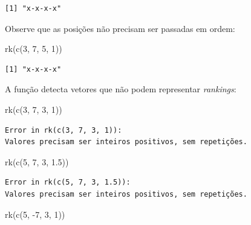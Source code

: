 \documentclass[
  letterpaper,
  DIV=11,
  numbers=noendperiod]{scrreprt}
\newenvironment{Shaded}{\begin{snugshade}}{\end{snugshade}}
\newcommand{\DecValTok}[1]{\textcolor[rgb]{0.68,0.00,0.00}{#1}}
\newcommand{\FloatTok}[1]{\textcolor[rgb]{0.68,0.00,0.00}{#1}}
\newcommand{\FunctionTok}[1]{\textcolor[rgb]{0.28,0.35,0.67}{#1}}
\newcommand{\NormalTok}[1]{\textcolor[rgb]{0.00,0.23,0.31}{#1}}
\newcommand{\SpecialCharTok}[1]{\textcolor[rgb]{0.37,0.37,0.37}{#1}}
\begin{document}
\begin{verbatim}
[1] "x-x-x-x"
\end{verbatim}

Observe que as posições não precisam ser passadas em ordem:

\begin{Shaded}
\begin{Highlighting}[]
\FunctionTok{rk}\NormalTok{(}\FunctionTok{c}\NormalTok{(}\DecValTok{3}\NormalTok{, }\DecValTok{7}\NormalTok{, }\DecValTok{5}\NormalTok{, }\DecValTok{1}\NormalTok{))}
\end{Highlighting}
\end{Shaded}

\begin{verbatim}
[1] "x-x-x-x"
\end{verbatim}

A função detecta vetores que não podem representar \emph{rankings}:

\begin{Shaded}
\begin{Highlighting}[]
\FunctionTok{rk}\NormalTok{(}\FunctionTok{c}\NormalTok{(}\DecValTok{3}\NormalTok{, }\DecValTok{7}\NormalTok{, }\DecValTok{3}\NormalTok{, }\DecValTok{1}\NormalTok{))}
\end{Highlighting}
\end{Shaded}

\begin{verbatim}
Error in rk(c(3, 7, 3, 1)): 
Valores precisam ser inteiros positivos, sem repetições.
\end{verbatim}

\begin{Shaded}
\begin{Highlighting}[]
\FunctionTok{rk}\NormalTok{(}\FunctionTok{c}\NormalTok{(}\DecValTok{5}\NormalTok{, }\DecValTok{7}\NormalTok{, }\DecValTok{3}\NormalTok{, }\FloatTok{1.5}\NormalTok{))}
\end{Highlighting}
\end{Shaded}

\begin{verbatim}
Error in rk(c(5, 7, 3, 1.5)): 
Valores precisam ser inteiros positivos, sem repetições.
\end{verbatim}

\begin{Shaded}
\begin{Highlighting}[]
\FunctionTok{rk}\NormalTok{(}\FunctionTok{c}\NormalTok{(}\DecValTok{5}\NormalTok{, }\SpecialCharTok{{-}}\DecValTok{7}\NormalTok{, }\DecValTok{3}\NormalTok{, }\DecValTok{1}\NormalTok{))}
\end{Highlighting}
\end{Shaded}
\end{document}
